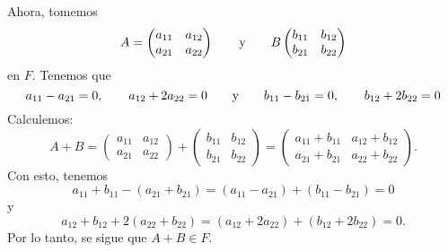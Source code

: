 \documentclass[11pt,a5]{aleph-examen}
\begin{document}
\begin{preguntas}
\begin{respuesta}
\begin{enumerate}
        Ahora, tomemos 
        \[
            A=\begin{pmatrix}
                a_{11} & a_{12} \\
                a_{21} & a_{22}
            \end{pmatrix}
            \qquad\text{y}\qquad
            B\begin{pmatrix}
                b_{11} & b_{12} \\
                b_{21} & b_{22}
            \end{pmatrix}
        \]
        en $F$. Tenemos que
        \[
            a_{11}-a_{21}=0,\qquad a_{12} + 2a_{22}=0
            \qquad\text{y}\qquad
            b_{11}-b_{21}=0,\qquad b_{12} + 2b_{22}=0
        \]
        Calculemos: 
        \[
            A + B = \begin{pmatrix}
                a_{11} & a_{12} \\
                a_{21} & a_{22}
            \end{pmatrix} + \begin{pmatrix}
                b_{11} & b_{12} \\
                b_{21} & b_{22}
            \end{pmatrix}  = \begin{pmatrix}
                 a_{11} + b_{11} &  a_{12} + b_{12} \\
                 a_{21} + b_{21} &  a_{22} + b_{22}
            \end{pmatrix}.
        \]
        Con esto, tenemos
        \[
            a_{11}+b_{11} -( a_{21}+b_{21} )  = (a_{11}-a_{21}) + (b_{11} - b_{21}) =  0
        \]
        y
        \[
            a_{12} + b_{12} + 2(a_{22} + b_{22}) =  (a_{12} + 2a_{22}) + (b_{12} + 2b_{22}) = 0.
        \]
        Por lo tanto, se sigue que $A + B \in F$.


\end{enumerate}
\end{respuesta}
\end{preguntas}
\end{document}
